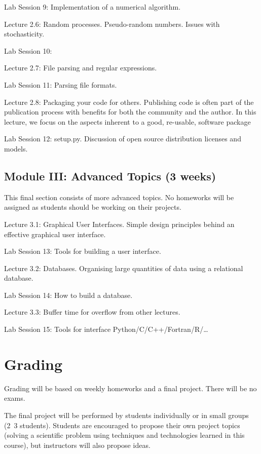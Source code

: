 \documentclass{article}
\begin{document}
Lab Session 9: Implementation of a numerical algorithm.

Lecture 2.6: Random processes. Pseudo-random numbers. Issues with stochasticity.

Lab Session 10: 

Lecture 2.7: File parsing and regular expressions.

Lab Session 11: Parsing file formats.

Lecture 2.8: Packaging your code for others. Publishing code is often part of the publication process with benefits for both the community and the author. In this lecture, we focus on the aspects inherent to a good, re-usable, software package

Lab Session 12: setup.py. Discussion of open source distribution licenses and models.

\subsection{Module III: Advanced Topics (3 weeks)}

This final section consists of more advanced topics. No homeworks will be assigned as students should be working on their projects.

Lecture 3.1: Graphical User Interfaces. Simple design principles behind an effective graphical user interface.

Lab Session 13: Tools for building a user interface.

Lecture 3.2: Databases. Organising large quantities of data using a relational database.

Lab Session 14: How to build a database.

Lecture 3.3: Buffer time for overflow from other lectures.

Lab Session 15: Tools for interface Python/C/C++/Fortran/R/\dots

\section{Grading}

Grading will be based on weekly homeworks and a final project. There will be no exams.

The final project will be performed by students individually or in small groups (2~3 students). Students are encouraged to propose their own project topics (solving a scientific problem using techniques and technologies learned in this course), but instructors will also propose ideas.
\end{document}
